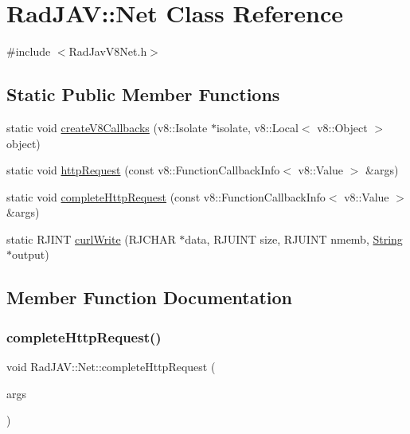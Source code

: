 \hypertarget{class_rad_j_a_v_1_1_net}{}\section{Rad\+J\+AV\+:\+:Net Class Reference}
\label{class_rad_j_a_v_1_1_net}


{\ttfamily \#include $<$Rad\+Jav\+V8\+Net.\+h$>$}

\subsection*{Static Public Member Functions}
\begin{DoxyCompactItemize}
\item 
static void \mbox{\hyperlink{class_rad_j_a_v_1_1_net_a92ffc903f2cc258d6b0bb5aca8708e2f}{create\+V8\+Callbacks}} (v8\+::\+Isolate $\ast$isolate, v8\+::\+Local$<$ v8\+::\+Object $>$ object)
\item 
static void \mbox{\hyperlink{class_rad_j_a_v_1_1_net_aecb0204afd2463828edd5e8904800b79}{http\+Request}} (const v8\+::\+Function\+Callback\+Info$<$ v8\+::\+Value $>$ \&args)
\item 
static void \mbox{\hyperlink{class_rad_j_a_v_1_1_net_aebfee46e4df218eebc17a1c16305fa2b}{complete\+Http\+Request}} (const v8\+::\+Function\+Callback\+Info$<$ v8\+::\+Value $>$ \&args)
\item 
static R\+J\+I\+NT \mbox{\hyperlink{class_rad_j_a_v_1_1_net_ab31cf79fc09c3984b8ead72fb4cf5310}{curl\+Write}} (R\+J\+C\+H\+AR $\ast$data, R\+J\+U\+I\+NT size, R\+J\+U\+I\+NT nmemb, \mbox{\hyperlink{class_rad_j_a_v_1_1_string}{String}} $\ast$output)
\end{DoxyCompactItemize}


\subsection{Member Function Documentation}
\mbox{\label{class_rad_j_a_v_1_1_net_aebfee46e4df218eebc17a1c16305fa2b}} 
\subsubsection{\texorpdfstring{complete\+Http\+Request()}{completeHttpRequest()}}
{\footnotesize\ttfamily void Rad\+J\+A\+V\+::\+Net\+::complete\+Http\+Request (\begin{DoxyParamCaption}\item[{const v8\+::\+Function\+Callback\+Info$<$ v8\+::\+Value $>$ \&}]{args }\end{DoxyParamCaption})\hspace{0.3cm}{\ttfamily [static]}}

